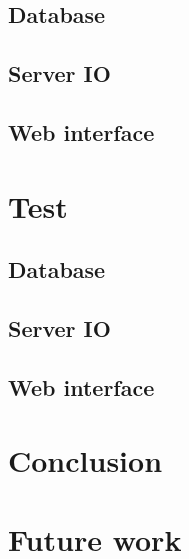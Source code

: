   \section{Database}
  \section{Server IO}
  \section{Web interface}

\chapter{Test}
  \section{Database}
  \section{Server IO}
  \section{Web interface}

\chapter{Conclusion}
\chapter{Future work}

\appendix


